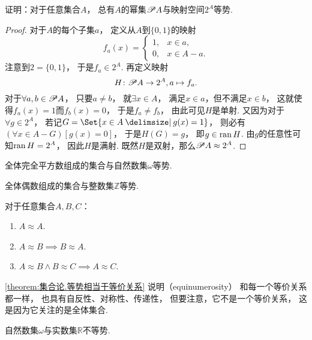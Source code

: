 \begin{example}\label{example:基数.幂集与特征函数空间等势}
证明：对于任意集合\(A\)，
总有\(A\)的幂集\(\mathscr{P} A\)与映射空间\(2^A\)等势.
\begin{proof}
对于\(A\)的每个子集\(a\)，
定义从\(A\)到\(\{0,1\}\)的映射\[
	f_a(x) = \left\{ \begin{array}{cl}
		1, & x \in a, \\
		0, & x \in A - a.
	\end{array} \right.
\]
注意到\(2=\{0,1\}\)，
于是\(f_a \in 2^A\).
再定义映射\[
	H\colon \mathscr{P} A \to 2^A,
	a \mapsto f_a.
\]
对于\(\forall a,b \in \mathscr{P} A\)，
只要\(a \neq b\)，
就\(\exists x \in A\)，
满足\(x \in a\)，但不满足\(x \in b\)，
这就使得\(f_a(x) = 1\)而\(f_b(x) = 0\)，
于是\(f_a \neq f_b\)，
由此可见\(H\)是单射.
又因为对于\(\forall g \in 2^A\)，
若记\(G = \Set{ x \in A \given g(x) = 1 }\)，
则必有\((\forall x \in A - G)[g(x) = 0]\)，
于是\(H(G) = g\)，
即\(g \in \operatorname{ran} H\).
由\(g\)的任意性可知\(\operatorname{ran} H = 2^A\)，
因此\(H\)是满射.
既然\(H\)是双射，那么\(\mathscr{P} A \approx 2^A\).
\end{proof}
\end{example}

\begin{example}
全体完全平方数组成的集合与自然数集\(\omega\)等势.
\end{example}

\begin{example}
全体偶数组成的集合与整数集\(\mathbb{Z}\)等势.
\end{example}

\begin{theorem}\label{theorem:集合论.等势相当于等价关系}
对于任意集合\(A,B,C\)：\begin{enumerate}
	\item \(A \approx A\).
	\item \(A \approx B \implies B \approx A\).
	\item \(A \approx B \land B \approx C \implies A \approx C\).
\end{enumerate}
\end{theorem}
\cref{theorem:集合论.等势相当于等价关系}
说明（equinumerosity）
和每一个等价关系都一样，
也具有自反性、对称性、传递性，
但要注意，它不是一个等价关系，
这是因为它关注的是全体集合.

\begin{theorem}
自然数集\(\omega\)与实数集\(\mathbb{R}\)不等势.
\end{theorem}

